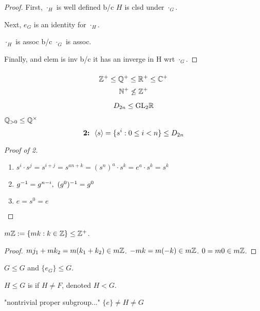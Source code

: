 \documentclass[12pt]{article}
\begin{document}
\bboxproof
\begin{proof}
  First, \(\cdot_H\) is well defined b/c \(H\) is clsd under \(\cdot_G\).

  Next, \(e_G\) is an identity for \(\cdot_H\).

  \(\cdot_H\) is assoc b/c \(\cdot_G\) is assoc.

  Finally, and elem is inv b/c it has an inverge in H wrt \(\cdot_G\).
\end{proof}
\ebox

\bboxex
\begin{exam}\(\ \)
  \[\mathbb Z^+\le\mathbb Q^+\le\mathbb R^+\le\mathbb C^+\]
  \[\mathbb N^+\not\le\mathbb Z^+\]
\end{exam}
\ebox


\bboxex
\begin{exam}\label{exam:the_dihedral_group_as_a_subgroup_of_the_general_linear_group}
  \[D_{2n}\le\mathrm{GL}_2\mathbb R\]
\end{exam}
\ebox

\bboxex
\begin{exam}
  \(\mathbb Q_{>0}\le\mathbb Q^\times\)
  \[\textbf{2: }\left\langle s\right\rangle=\{s^i:0\le i<n\}\le D_{2n}\]
\end{exam}
\ebox
\bboxproof
\begin{proof}[Proof of 2]
  \(\ \)
  \begin{enumerate}
    \item \(s^i\cdot s^j=s^{i+j}=s^{an+k}=(s^n)^a\cdot s^k=e^a\cdot s^k=s^k\)
    \item \(\inv g=g^{n-i},\ \inv{(g^0)}=g^0\)
    \item \(e=s^0=e\)
  \end{enumerate}
\end{proof}
\ebox


\bboxex
\begin{exam}
  \(m\mathbb Z:=\{mk:k\in\mathbb Z\}\le\mathbb Z^+\).
  \bboxproof
  \begin{proof}
    \(mj_1+mk_2=m(k_1+k_2)\in m\mathbb Z\).
    \(-mk=m(-k)\in m\mathbb Z\).
    \(0=m0\in m\mathbb Z\).
  \end{proof}
  \ebox

\end{exam}
\ebox

\bboxex
\begin{exam}
  \(G\le G\) and \(\{e_G\}\le G\).
\end{exam}
\ebox

\bbox
\begin{defn}\label{defn:proper_subgroup}
  \(H\le G\) is  if \(H\neq F\), denoted \(H<G\).
\end{defn}
\ebox
"nontrivial proper subgroup..." \(\{e\}\neq H\neq G\)
\end{document}
